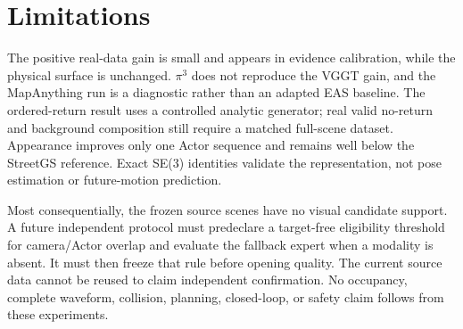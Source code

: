\section{Limitations}
The positive real-data gain is small and appears in evidence calibration, while the
physical surface is unchanged. $\pi^3$ does not reproduce the VGGT gain, and the
MapAnything run is a diagnostic rather than an adapted EAS baseline. The ordered-return
result uses a controlled analytic generator; real valid no-return and background
composition still require a matched full-scene dataset. Appearance improves only one
Actor sequence and remains well below the StreetGS reference. Exact SE(3) identities
validate the representation, not pose estimation or future-motion prediction.

Most consequentially, the frozen source scenes have no visual candidate support. A
future independent protocol must predeclare a target-free eligibility threshold for
camera/Actor overlap and evaluate the fallback expert when a modality is absent. It
must then freeze that rule before opening quality. The current source data cannot be
reused to claim independent confirmation. No occupancy, complete waveform, collision,
planning, closed-loop, or safety claim follows from these experiments.
